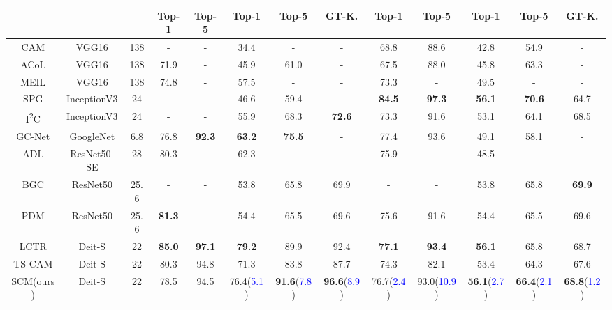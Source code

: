 \documentclass[runningheads]{llncs}
\begin{document}
\begin{table*}[t]
{\begin{threeparttable}
\begin{tabular}{c|c|c|cc|ccc|cc|ccc}
& & & Top-1 & Top-5 & Top-1 & Top-5 & GT-K. & Top-1 & Top-5 & Top-1 & Top-5 & GT-K. \\
\hline
CAM\cite{zhou2015cnnlocalization}               & VGG16       & 138 &  -     &  -     & 34.4  & -  & - &68.8       &88.6  & 42.8 & 54.9 & - \\
ACoL\cite{DBLP:journals/corr/abs-1804-06962}    & VGG16       & 138 & 71.9  & -     & 45.9  & 61.0  & - &67.5       &88.0  & 45.8 & 63.3 &- \\
MEIL\cite{Mai_2020_CVPR}                        & VGG16       & 138 &74.8       &-       &57.5       &-       & - &73.3       &-  &49.5 &- &-  \\
SPG\cite{zhang2018selfproduced}                 & InceptionV3 & 24  &      & -      & 46.6      &59.4       &  - &\textbf{84.5} &\textbf{97.3}   &\textbf{56.1} &\textbf{70.6} &64.7 \\
I\textsuperscript{2}C\cite{zhang2020interimage} & InceptionV3 & 24  & - & -       &55.9       &68.3 &\textbf{72.6} &  73.3  &91.6       &53.1       &64.1       & 68.5 \\
GC-Net\cite{lu2020geometry}                     & GoogleNet   & 6.8     & 76.8  &\textbf{92.3}      &\textbf{63.2}       &\textbf{75.5}      & - & 77.4  &93.6  &49.1 &58.1 & -\\
ADL\cite{choe2019attentionbased}                & ResNet50-SE & 28      &80.3   &-  & 62.3  & -     & -     & 75.9  & -    & 48.5 & - & -\\
BGC\cite{kim2022bridging}                       & ResNet50    &25.6     &-      &-  & 53.8  & 65.8  & 69.9  & -     & -     & 53.8 & 65.8 & \textbf{69.9}\\
PDM\cite{meng2022pdm}                           & ResNet50    &25.6     &\textbf{81.3 }      &-       & 54.4  & 65.5  & 69.6 &75.6 &91.6 & 54.4 & 65.5 & 69.6 \\
\hline
LCTR\cite{chen2022lctr}                 & Deit-S             &22     &\textbf{85.0}       &\textbf{97.1}       &\textbf{79.2}       &89.9       &92.4 & \textbf{77.1} & \textbf{93.4} & \textbf{56.1} & 65.8 & 68.7     \\
TS-CAM\cite{gao2021tscam}                       & Deit-S      & 22  & 80.3  & 94.8  & 71.3 & 83.8 & 87.7  & 74.3 & 82.1 & 53.4 & 64.3 & 67.6\\
SCM(ours)                                       & Deit-S      & 22  &78.5 &94.5 &  76.4(\textcolor{blue}{5.1}) & \textbf{91.6}(\textcolor{blue}{7.8}) & \textbf{96.6}(\textcolor{blue}{8.9}) &76.7(\textcolor{blue}{2.4}) &93.0(\textcolor{blue}{10.9}) &\textbf{56.1}(\textcolor{blue}{2.7}) & \textbf{66.4}(\textcolor{blue}{2.1}) & \textbf{68.8}(\textcolor{blue}{1.2})\\

\end{tabular}
\end{threeparttable}}
\end{table*}
\end{document}

